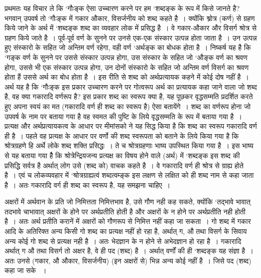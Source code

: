 {प्रथमतः यह विचार ले कि ‘गौःङ्क ऐसा उच्चारण करने पर हम ‘शब्दङ्क के रूप में किसे जानते है? भगवान् उपवर्ष तो ‘गौःङ्क में गकार औकार, विसर्जनीय को शब्द कहते है~। क्योंकि श्र्रोत्र (कर्ण) से ग्रहण किये जाने के अर्थ में ‘शब्दङ्क शब्द का व्यवहार लोक में प्रसिद्ध है~। वे गकार-औकार और विसर्ग श्रोत्र से ग्रहण किये जाते है~। पूर्व-पूर्व वर्ण के सुनने पर उनसे एक-एक संस्कार उत्पन्न होता जाता है~। उन उत्पन्न हुए संस्कारो के सहित जो अन्तिम वर्ण रहेगा, वही वर्ण ‘अर्थङ्क का बोधक होता है~। निष्कर्ष यह है कि ‘गङ्क वर्ण के सुनने पर उससे संस्कार उत्पन्न होगा, उस संस्कार के सहित जो ‘औङ्क वर्ण का श्रवण होगा, उससे भी एक संस्कार उत्पन्न होगा, उन दोनों संस्कारो के सहित जो अन्तिम वर्ण विसर्ग का श्रवण होता हैं उससे अर्थ का बोध होता है~। इस रीति से शब्द को अर्थप्रत्यायक कहने में कोई दोष नहीं है~। अर्थ यह है कि ‘गौःङ्क इस प्रकार उच्चारण करने पर गोत्वरूप अर्थ का प्रत्यायक कहा जाने वाला जो शब्द है, वह क्या गकारादि वर्णरूप है? इस प्रकार शब्द का स्वरूप क्या है, यह पूछकर वृद्धसम्मति प्रदर्शित करते हुए अपना स्वयं का मत (गकारादि वर्ण ही शब्द का स्वरूप है) ऐसा बतायेंगे~। शब्द का वर्णरूप होना जो उपवर्ष के नाम पर बताया गया है वह स्वमत की पुष्टि के लिये वृद्धसम्मति के रूप में बताया गया है~। प्रत्यक्ष और अर्थप्रत्यायकत्व के आधार पर मीमांसको ने यह सिद्ध किया है कि  शब्द का स्वरूप गकारादि वर्ण ही है~। पहले वह प्रत्यक्ष के आधार पर वर्णो की शब्द स्वरूपता को बताने के लिये किया गया है कि श्रोत्रग्रहणे हि अर्थे लोके शब्द शक्ति प्रसिद्धः~। ते च श्रोत्रग्रहणाः भाष्य उपस्थित किया गया है~। इस भाष्य से यह बताया गया हैै कि श्रोत्रेन्द्रियजन्य प्रत्यक्ष का विषय होने वाले (अर्थ) में ‘शब्दङ्क इस शब्द की प्रसिद्धि सर्वत्र है अर्थात् लोग उसे (शब्द को) वाचक कहते है~। वे गकारादि वर्ण ही श्रोत्र से ग्राह्य होते है~। एवं च लोकव्यवहार में ‘श्रोत्रग्राह्यत्वं शब्दत्वम्ङ्क इस लक्षण से लक्षित को ही शब्द नाम से कहा जाता है~। अतः गकारादि वर्ग ही शब्द का स्वरूप है, यह समझना चाहिए~। 

अक्षरों में अर्थवान के प्रति जो निमित्तता निमित्तभाव है, उसे गौण नही कह सकते, क्योंकि ‘तद्भावे भावात् तदभावे चाभावात् अक्षरों के होने पर अर्थप्रतीति होती है और अक्षरों के न होने पर अर्थप्रतीति नही होती है~। अतः अर्थ प्रतीति करानें में अक्षरों को गौणरूप से निमित्त नहीं कहा जा सकता~। गो शब्द में गकार आदि के अतिरिक्त अन्य किसी गो शब्द का प्रत्यक्ष नहीं हो रहा है, अर्थात् ग, औ तथा विसर्ग के सिवाय अन्य कोई गो शब्द से प्रत्यक्ष नही है~। अतः भेदज्ञान के न होने से अभेदज्ञान हो रहा है~। गकारादि अर्थात् ग औ तथा विसर्ग तो अक्षर है, वे ही पद (शब्द) है~। अर्थात् वर्णों की ही ‘शब्दङ्क यह संज्ञा है~। अतः उनसे (गकार, औ औकार, विसर्जनीय) (इन अक्षरों से) भिन्न अन्य कोई नहीं है~। जिसे पद (शब्द) कहा जा सके ~। 

}
